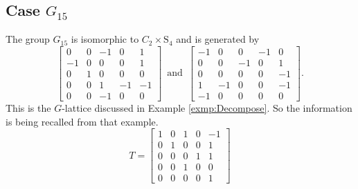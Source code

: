 \documentclass{article}
\theoremstyle{plain}
\theoremstyle{definition}
\newcommand{\Q}{\ensuremath{\mathbb{Q}}}
\newcommand{\tand}{\ensuremath{\,\,\, \text{and} \,\,\,}}
\begin{document}
\subsection{Case $G_{15}$}
The group $G_{15} $ is isomorphic to $C_2 \times \mathrm{S}_4$ and is generated by 
$$
\left[ \begin {array}{ccccc} 0&0&-1&0&1\\ -1&0&0&0&
1\\ 0&1&0&0&0\\ 0&0&1&-1&-1
\\ 0&0&-1&0&0\end {array} \right] 
\tand
 \left[ \begin {array}{ccccc} -1&0&0&-1&0\\ 0&0&-1&0
&1\\ 0&0&0&0&-1\\ 1&-1&0&0&-1
\\ -1&0&0&0&0\end {array} \right].
$$
This is the $G$-lattice discussed in Example \ref{exmp:Decompose}. So the information is being recalled from that example.
$$
T = \left[ \begin {array}{ccccc} 1&0&1&0&-1\\ 0&1&0&0&1
\\0&0&0&1&1\\0&0&1&0&0
\\0&0&0&0&1\end {array} \right] 
$$
\end{document}
